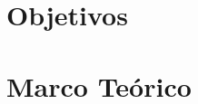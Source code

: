 \documentclass{article}
\begin{document}

\tableofcontents
\newpage

\section{Objetivos}



\section{Marco Teórico}


\end{document}
